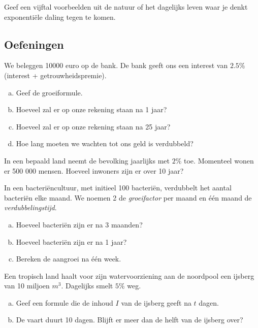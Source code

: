 \documentclass[12pt,twoside,a4paper]{article}
\begin{document}
\begin{oefening}
Geef een vijftal voorbeelden uit de natuur of het dagelijks leven waar je denkt exponentiële daling tegen te komen.
\end{oefening}

\subsection{Oefeningen}

\begin{oefening}
We beleggen 10000 euro op de bank. De bank geeft ons een interest van $2.5\%$ (interest + getrouwheidspremie).
\begin{enumerate}[(a)]
  \item Geef de groeiformule.
  \item Hoeveel zal er op onze rekening staan na 1 jaar?
  \item Hoeveel zal er op onze rekening staan na 25 jaar?
  \item Hoe lang moeten we wachten tot ons geld is verdubbeld?
\end{enumerate}
\end{oefening}

\begin{oefening}
In een bepaald land neemt de bevolking jaarlijks met $2\%$ toe. Momenteel wonen er 500 000 mensen. Hoeveel inwoners zijn er over 10 jaar?
\end{oefening}

\begin{oefening} %
In een bacteriëncultuur, met initieel 100 bacteriën, verdubbelt het aantal bacteriën elke maand. We noemen 2 de {\em groeifactor} per maand en één maand de {\em verdubbelingstijd}.
\begin{enumerate}[(a)]
  \item Hoeveel bacteriën zijn er na 3 maanden?
  \item Hoeveel bacteriën zijn er na 1 jaar?
  \item Bereken de aangroei na één week.
\end{enumerate}
\end{oefening}

\begin{oefening} %
Een tropisch land haalt voor zijn watervoorziening aan de noordpool een ijsberg van 10 miljoen $m^3$. Dagelijks smelt $5\%$ weg.
\begin{enumerate}[(a)]
  \item Geef een formule die de inhoud $I$ van de ijsberg geeft na $t$ dagen.
  \item De vaart duurt 10 dagen. Blijft er meer dan de helft van de ijsberg over?
\end{enumerate}
\end{oefening}
\end{document}
